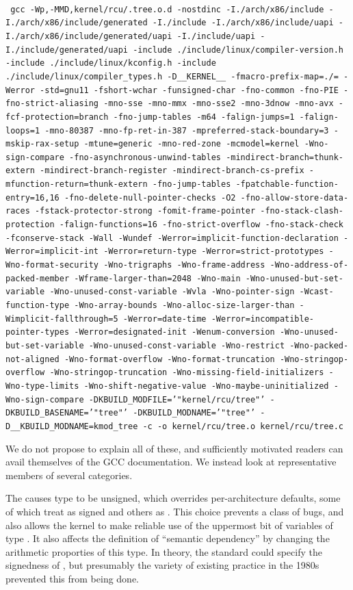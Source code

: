 \documentclass[10]{article}
\begin{document}
~\\
{
	\scriptsize
	\texttt{
	gcc -Wp,-MMD,kernel/rcu/.tree.o.d -nostdinc
	-I./arch/x86/include -I./arch/x86/include/generated  -I./include
	-I./arch/x86/include/uapi -I./arch/x86/include/generated/uapi
	-I./include/uapi -I./include/generated/uapi
	-include ./include/linux/compiler-version.h
	-include ./include/linux/kconfig.h -include
	./include/linux/compiler\_types.h -D\_\_KERNEL\_\_
	-fmacro-prefix-map=./= -Werror -std=gnu11 -fshort-wchar
	-funsigned-char -fno-common -fno-PIE -fno-strict-aliasing -mno-sse
	-mno-mmx -mno-sse2 -mno-3dnow -mno-avx -fcf-protection=branch
	-fno-jump-tables -m64 -falign-jumps=1 -falign-loops=1
	-mno-80387 -mno-fp-ret-in-387 -mpreferred-stack-boundary=3
	-mskip-rax-setup -mtune=generic -mno-red-zone -mcmodel=kernel
	-Wno-sign-compare -fno-asynchronous-unwind-tables
	-mindirect-branch=thunk-extern -mindirect-branch-register
	-mindirect-branch-cs-prefix -mfunction-return=thunk-extern
	-fno-jump-tables -fpatchable-function-entry=16,16
	-fno-delete-null-pointer-checks -O2 -fno-allow-store-data-races
	-fstack-protector-strong -fomit-frame-pointer
	-fno-stack-clash-protection -falign-functions=16
	-fno-strict-overflow -fno-stack-check -fconserve-stack
	-Wall -Wundef -Werror=implicit-function-declaration
	-Werror=implicit-int -Werror=return-type -Werror=strict-prototypes
	-Wno-format-security -Wno-trigraphs -Wno-frame-address
	-Wno-address-of-packed-member -Wframe-larger-than=2048 -Wno-main
	-Wno-unused-but-set-variable -Wno-unused-const-variable -Wvla
	-Wno-pointer-sign -Wcast-function-type -Wno-array-bounds
	-Wno-alloc-size-larger-than -Wimplicit-fallthrough=5
	-Werror=date-time -Werror=incompatible-pointer-types
	-Werror=designated-init -Wenum-conversion
	-Wno-unused-but-set-variable -Wno-unused-const-variable
	-Wno-restrict -Wno-packed-not-aligned -Wno-format-overflow
	-Wno-format-truncation -Wno-stringop-overflow
	-Wno-stringop-truncation -Wno-missing-field-initializers
	-Wno-type-limits -Wno-shift-negative-value
	-Wno-maybe-uninitialized -Wno-sign-compare
	-DKBUILD\_MODFILE='"kernel/rcu/tree"' -DKBUILD\_BASENAME='"tree"'
	-DKBUILD\_MODNAME='"tree"' -D\_\_KBUILD\_MODNAME=kmod\_tree -c
	-o kernel/rcu/tree.o kernel/rcu/tree.c
	}
}

We do not propose to explain all of these, and sufficiently motivated
readers can avail themselves of the GCC documentation.
We instead look at representative members of several categories.

The  causes type  to be unsigned, which
overrides per-architecture defaults, some of which treat 
as signed and others as .
This choice prevents a class of bugs, and also allows the kernel to make
reliable use of the uppermost bit of variables of type .
It also affects the definition of ``semantic dependency'' by changing
the arithmetic proporties of this type.
In theory, the standard could specify the signedness of ,
but presumably the variety of existing practice in the 1980s prevented
this from being done.
\end{document}

